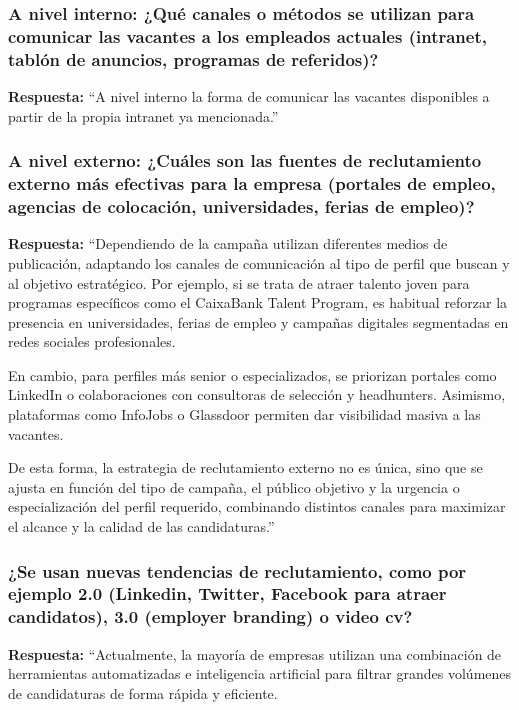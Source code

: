 \subsubsection*{A nivel interno: ¿Qué canales o métodos se utilizan para comunicar las vacantes a los empleados actuales (intranet, tablón de anuncios, programas de referidos)?}

\textbf{Respuesta:}\newline
``A nivel interno la forma de comunicar las vacantes disponibles a partir de la propia intranet ya mencionada.''

\subsubsection*{A nivel externo: ¿Cuáles son las fuentes de reclutamiento externo más efectivas para la empresa (portales de empleo, agencias de colocación, universidades, ferias de empleo)?}

\textbf{Respuesta:}\newline
``Dependiendo de la campaña utilizan diferentes medios de publicación, adaptando los canales de comunicación al tipo de perfil que buscan y al objetivo estratégico. Por ejemplo, si se trata de atraer talento joven para programas específicos como el CaixaBank Talent Program, es habitual reforzar la presencia en universidades, ferias de empleo y campañas digitales segmentadas en redes sociales profesionales.

En cambio, para perfiles más senior o especializados, se priorizan portales como LinkedIn o colaboraciones con consultoras de selección y headhunters. Asimismo, plataformas como InfoJobs o Glassdoor permiten dar visibilidad masiva a las vacantes.

De esta forma, la estrategia de reclutamiento externo no es única, sino que se ajusta en función del tipo de campaña, el público objetivo y la urgencia o especialización del perfil requerido, combinando distintos canales para maximizar el alcance y la calidad de las candidaturas.''

\subsubsection*{¿Se usan nuevas tendencias de reclutamiento, como por ejemplo 2.0 (Linkedin, Twitter, Facebook para atraer candidatos), 3.0 (employer branding) o video cv?}

\textbf{Respuesta:}\newline
``Actualmente, la mayoría de empresas utilizan una combinación de herramientas automatizadas e inteligencia artificial para filtrar grandes volúmenes de candidaturas de forma rápida y eficiente. 

